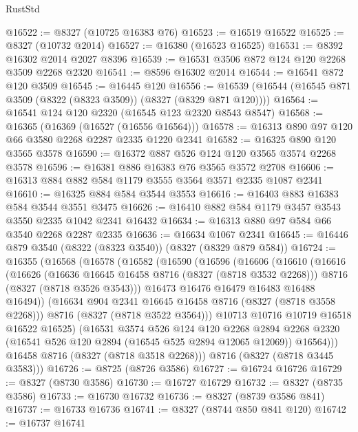 \begin{lexlean}{RustStd}
\begin{coremodule}
@16522 := @8327 (@10725 @16383 @76)
@16523 := @16519 @16522
@16525 := @8327 (@10732 @2014)
@16527 := @16380 (@16523 @16525)
@16531 := @8392 @16302 @2014 @2027 @8396
@16539 := @16531 @3506 @872 @124 @120 @2268 @3509 @2268 @2320
@16541 := @8596 @16302 @2014
@16544 := @16541 @872 @120 @3509
@16545 := @16445 @120
@16556 := @16539 (@16544 (@16545 @871 @3509 (@8322 (@8323 @3509)) (@8327 (@8329 @871 @120))))
@16564 := @16541 @124 @120 @2320 (@16545 @123 @2320 @8543 @8547)
@16568 := @16365 (@16369 (@16527 (@16556 @16564)))
@16578 := @16313 @890 @97 @120 @66 @3580 @2268 @2287 @2335 @1220 @2341
@16582 := @16325 @890 @120 @3565 @3578
@16590 := @16372 @887 @526 @124 @120 @3565 @3574 @2268 @3578
@16596 := @16381 @886 @16383 @76 @3565 @3572 @2708
@16606 := @16313 @884 @882 @584 @1179 @3555 @3564 @3571 @2335 @1087 @2341
@16610 := @16325 @884 @584 @3544 @3553
@16616 := @16403 @883 @16383 @584 @3544 @3551 @3475
@16626 := @16410 @882 @584 @1179 @3457 @3543 @3550 @2335 @1042 @2341 @16432
@16634 := @16313 @880 @97 @584 @66 @3540 @2268 @2287 @2335
@16636 := @16634 @1067 @2341
@16645 := @16446 @879 @3540 (@8322 (@8323 @3540)) (@8327 (@8329 @879 @584))
@16724 := @16355
    (@16568
      (@16578
        (@16582
          (@16590
            (@16596
              (@16606
                (@16610
                  (@16616
                    (@16626
                      (@16636 @16645 @16458 @8716 (@8327 (@8718 @3532 @2268)))
                      @8716
                      (@8327 (@8718 @3526 @3543)))
                    @16473
                    @16476
                    @16479
                    @16483
                    @16488
                    @16494))
                (@16634 @904 @2341 @16645 @16458 @8716 (@8327 (@8718 @3558 @2268)))
                @8716
                (@8327 (@8718 @3522 @3564)))
              @10713
              @10716
              @10719
              @16518
              @16522
              @16525)
            (@16531
              @3574
              @526
              @124
              @120
              @2268
              @2894
              @2268
              @2320
              (@16541 @526 @120 @2894 (@16545 @525 @2894 @12065 @12069))
              @16564)))
        @16458
        @8716
        (@8327 (@8718 @3518 @2268)))
      @8716
      (@8327 (@8718 @3445 @3583)))
@16726 := @8725 (@8726 @3586)
@16727 := @16724 @16726
@16729 := @8327 (@8730 @3586)
@16730 := @16727 @16729
@16732 := @8327 (@8735 @3586)
@16733 := @16730 @16732
@16736 := @8327 (@8739 @3586 @841)
@16737 := @16733 @16736
@16741 := @8327 (@8744 @850 @841 @120)
@16742 := @16737 @16741

\end{coremodule}
\end{lexlean}
